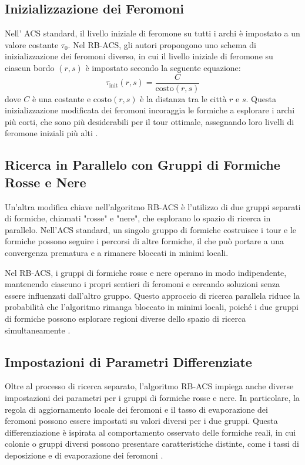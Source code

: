 \subsection{Inizializzazione dei Feromoni}
Nell' \Gls{ACS} standard, il livello iniziale di feromone su tutti i archi è impostato a un valore costante $\tau_0$. Nel \Gls{RB-ACS}, gli autori propongono uno schema di inizializzazione dei feromoni diverso, in cui il livello iniziale di feromone su ciascun bordo $(r,s)$ è impostato secondo la seguente equazione:
\begin{equation}
	\tau_\text{init}(r,s) = \frac{C}{\text{costo}(r,s)}
\end{equation}
dove $C$ è una costante e $\text{costo}(r,s)$ è la distanza tra le città $r$ e $s$. Questa inizializzazione modificata dei feromoni incoraggia le formiche a esplorare i archi più corti, che sono più desiderabili per il tour ottimale, assegnando loro livelli di feromone iniziali più alti \cite{Hassan2013}.

\subsection{Ricerca in Parallelo con Gruppi di Formiche Rosse e Nere}
Un'altra modifica chiave nell'algoritmo \Gls{RB-ACS} è l'utilizzo di due gruppi separati di formiche, chiamati "rosse" e "nere", che esplorano lo spazio di ricerca in parallelo. Nell'\Gls{ACS} standard, un singolo gruppo di formiche costruisce i tour e le formiche possono seguire i percorsi di altre formiche, il che può portare a una convergenza prematura e a rimanere bloccati in minimi locali.

Nel \Gls{RB-ACS}, i gruppi di formiche rosse e nere operano in modo indipendente, mantenendo ciascuno i propri sentieri di feromoni e cercando soluzioni senza essere influenzati dall'altro gruppo. Questo approccio di ricerca parallela riduce la probabilità che l'algoritmo rimanga bloccato in minimi locali, poiché i due gruppi di formiche possono esplorare regioni diverse dello spazio di ricerca simultaneamente \cite{Hassan2013}.

\subsection{Impostazioni di Parametri Differenziate}
Oltre al processo di ricerca separato, l'algoritmo \Gls{RB-ACS} impiega anche diverse impostazioni dei parametri per i gruppi di formiche rosse e nere. In particolare, la regola di aggiornamento locale dei feromoni e il tasso di evaporazione dei feromoni possono essere impostati su valori diversi per i due gruppi. Questa differenziazione è ispirata al comportamento osservato delle formiche reali, in cui colonie o gruppi diversi possono presentare caratteristiche distinte, come i tassi di deposizione e di evaporazione dei feromoni \cite{Hassan2013}.

